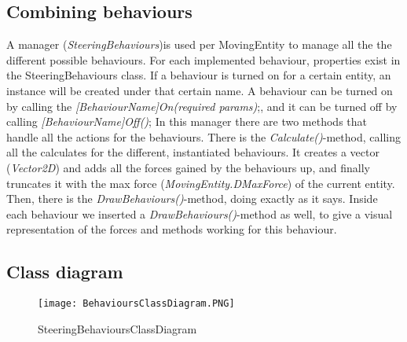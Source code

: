 \subsection[How the steering behaviours are combined]{Combining behaviours}\label{subsec:combiningBehaviours}
A manager (\textit{SteeringBehaviours})is used per MovingEntity to manage all the the different possible behaviours.
For each implemented behaviour, properties exist in the SteeringBehaviours class.
If a behaviour is turned on for a certain entity, an instance will be created under that certain name.
A behaviour can be turned on by calling the \textit{[BehaviourName]On(required params)};, and it can be turned off by calling \textit{[BehaviourName]Off()};
In this manager there are two methods that handle all the actions for the behaviours.
There is the \textit{Calculate()}-method, calling all the calculates for the different, instantiated behaviours.
It creates a vector (\textit{Vector2D}) and adds all the forces gained by the behaviours up, and finally truncates it with the max force (\textit{MovingEntity.DMaxForce}) of the current entity.
Then, there is the \textit{DrawBehaviours()}-method, doing exactly as it says.
Inside each behaviour we inserted a \textit{DrawBehaviours()}-method as well, to give a visual representation of the forces and methods working for this behaviour.
\subsection[The class diagram of our behaviour system]{Class diagram}
\begin{figure}[h!]
    \begin{center}
        \texttt{[image: BehavioursClassDiagram.PNG]}
    \end{center}
    \caption{SteeringBehavioursClassDiagram}
    \label{fig:SteeringBehavioursClassDiagram}
\end{figure}
\newpage
